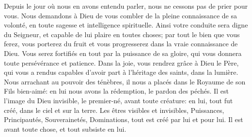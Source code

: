 Depuis le jour où nous en avons entendu parler,
	nous ne cessons pas de prier pour vous.
Nous demandons à Dieu de vous combler de la pleine connaissance de sa volonté,
	en toute sagesse et intelligence spirituelle.
Ainsi votre conduite sera digne du Seigneur,
	et capable de lui plaire en toutes choses;
	par tout le bien que vous ferez, vous porterez du fruit
	et vous progresserez dans la vraie connaissance de Dieu.
Vous serez fortifiés en tout par la puissance de sa gloire,
	qui vous donnera toute persévérance et patience.
Dans la joie, vous rendrez grâce à Dieu le Père,
	qui vous a rendus capables d’avoir part à l’héritage des saints,
		dans la lumière.
Nous arrachant au pouvoir des ténèbres,
	il nous a placés dans le Royaume de son Fils bien-aimé:
	en lui nous avons la rédemption, le pardon des péchés.
Il est l’image du Dieu invisible, le premier-né, avant toute créature:
	en lui, tout fut créé, dans le ciel et sur la terre.
Les êtres visibles et invisibles, Puissances, Principautés,
	Souverainetés, Dominations, tout est créé par lui et pour lui.
Il est avant toute chose, et tout subsiste en lui.
